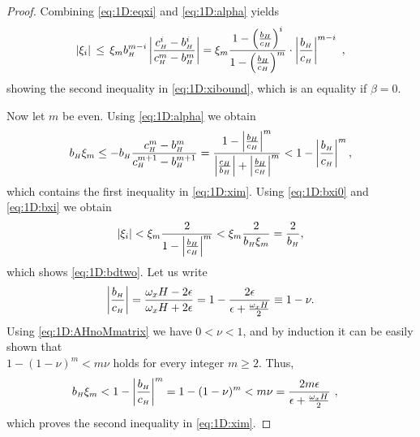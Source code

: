 \begin{proof}
Combining \eqref{eq:1D:eqxi} and \eqref{eq:1D:alpha} yields
%
\begin{equation}\label{eq:1D:bxi0}
\left| \xi_{i} \right|
 \, \leq \, \xi_{m}b_{\scriptscriptstyle H}^{m-i} \left|\frac{c_{\scriptscriptstyle H}^{i}-b_{\scriptscriptstyle H}^{i}}{c_{\scriptscriptstyle H}^{m}-b_{\scriptscriptstyle H}^{m}}\right|=
 \xi_{m}\frac{1-\left(\frac{b_{\scriptscriptstyle H}}{c_{\scriptscriptstyle H}}\right)^{i}}{1-\left(\frac{b_{\scriptscriptstyle H}}{c_{\scriptscriptstyle H}}\right)^{m}} \cdot\left|\frac{b_{\scriptscriptstyle H}}{c_{\scriptscriptstyle H}}\right|^{m-i}~,
\end{equation}
%
showing the second inequality in \eqref{eq:1D:xibound}, which is an equality if
$\beta=0$.


Now let $m$ be even.
%
%
Using \eqref{eq:1D:alpha} we obtain
%
\begin{equation}\label{eq:1D:bxi}
 b_{\scriptscriptstyle H}\xi_{m}	\leq	-b_{\scriptscriptstyle H}\frac{c_{\scriptscriptstyle H}^{m}-b_{\scriptscriptstyle H}^{m}}{c_{\scriptscriptstyle H}^{m+1}-b_{\scriptscriptstyle H}^{m+1}}=
 \frac{1-\left|\frac{b_{\scriptscriptstyle H}}{c_{\scriptscriptstyle H}}\right|^{m}}{\left|\frac{c_{\scriptscriptstyle H}}{b_{\scriptscriptstyle H}}\right|+\left|\frac{b_{\scriptscriptstyle H}}{c_{\scriptscriptstyle H}}\right|^{m}}
<1-\left|\frac{b_{\scriptscriptstyle H}}{c_{\scriptscriptstyle H}}\right|^{m},
\end{equation}
%
which contains the first inequality in \eqref{eq:1D:xim}. Using \eqref{eq:1D:bxi0}
and \eqref{eq:1D:bxi} we obtain
%
$$\left|\xi_{i}\right| <
 \xi_{m}\frac{2}{1-\left|\frac{b_{\scriptscriptstyle H}}{c_{\scriptscriptstyle H}}\right|^{m}}
 <  \xi_{m}\frac{2}{ b_{\scriptscriptstyle H}\xi_{m}} = \frac{2}{ b_{\scriptscriptstyle H}},$$
%
which shows \eqref{eq:1D:bdtwo}. Let us write
%
$$\left|\frac{b_{\scriptscriptstyle H}}{c_{\scriptscriptstyle H}}\right|	=
\frac{\omega_x H-2\epsilon}{\omega_x H+2\epsilon}=
1 - \frac{2\epsilon}{\epsilon+\frac{\omega_x H}{2}}\equiv 1 - \nu.$$
%
Using \eqref{eq:1D:AHnoMmatrix} we have $0 < \nu < 1$, and by induction it
can be easily shown that\\ $1 - (1-\nu)^m < m\nu$ holds for every integer
$m\geq 2$. Thus,
%
\begin{align*}%
 \entryvE\xi_{m}	&<	1-\left|\frac{\entryvE}{\entryvW}\right|^{m}
 = 1 - (1-\nu)^m < m\nu
 =\frac{2m\epsilon}{\epsilon+\frac{\omega_x H}{2}} ~,
\end{align*}
%
which proves the second inequality in \eqref{eq:1D:xim}.
%
%
%
\end{proof}

